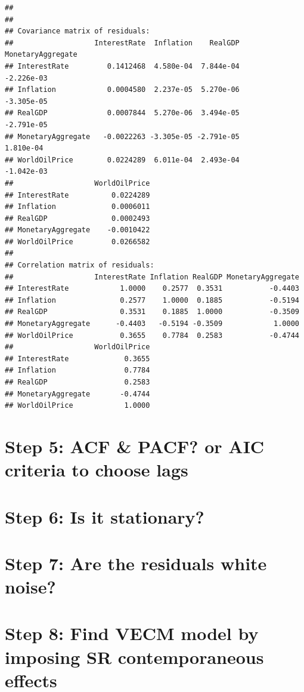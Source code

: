 \documentclass[11pt,preprint, authoryear]{elsarticle}
\numberwithin{equation}{section}
\numberwithin{figure}{section}
\numberwithin{table}{section}
\begin{document}
\begin{verbatim}
## 
## 
## Covariance matrix of residuals:
##                   InterestRate  Inflation    RealGDP MonetaryAggregate
## InterestRate         0.1412468  4.580e-04  7.844e-04        -2.226e-03
## Inflation            0.0004580  2.237e-05  5.270e-06        -3.305e-05
## RealGDP              0.0007844  5.270e-06  3.494e-05        -2.791e-05
## MonetaryAggregate   -0.0022263 -3.305e-05 -2.791e-05         1.810e-04
## WorldOilPrice        0.0224289  6.011e-04  2.493e-04        -1.042e-03
##                   WorldOilPrice
## InterestRate          0.0224289
## Inflation             0.0006011
## RealGDP               0.0002493
## MonetaryAggregate    -0.0010422
## WorldOilPrice         0.0266582
## 
## Correlation matrix of residuals:
##                   InterestRate Inflation RealGDP MonetaryAggregate
## InterestRate            1.0000    0.2577  0.3531           -0.4403
## Inflation               0.2577    1.0000  0.1885           -0.5194
## RealGDP                 0.3531    0.1885  1.0000           -0.3509
## MonetaryAggregate      -0.4403   -0.5194 -0.3509            1.0000
## WorldOilPrice           0.3655    0.7784  0.2583           -0.4744
##                   WorldOilPrice
## InterestRate             0.3655
## Inflation                0.7784
## RealGDP                  0.2583
## MonetaryAggregate       -0.4744
## WorldOilPrice            1.0000
\end{verbatim}

\hypertarget{step-5-acf-pacf-or-aic-criteria-to-choose-lags}{%
\section{Step 5: ACF \& PACF? or AIC criteria to choose
lags}\label{step-5-acf-pacf-or-aic-criteria-to-choose-lags}}

\hypertarget{step-6-is-it-stationary}{%
\section{Step 6: Is it stationary?}\label{step-6-is-it-stationary}}

\hypertarget{step-7-are-the-residuals-white-noise}{%
\section{Step 7: Are the residuals white
noise?}\label{step-7-are-the-residuals-white-noise}}

\hypertarget{step-8-find-vecm-model-by-imposing-sr-contemporaneous-effects}{%
\section{Step 8: Find VECM model by imposing SR contemporaneous
effects}\label{step-8-find-vecm-model-by-imposing-sr-contemporaneous-effects}}
\end{document}
